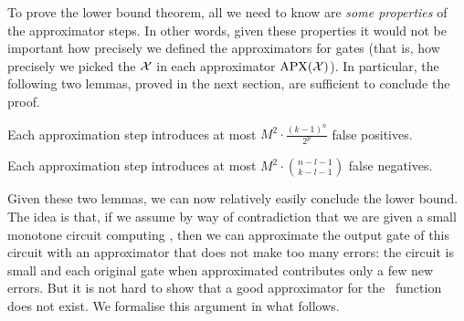 To prove the lower bound theorem, all we need to know are \emph{some properties} of the approximator steps. In other words, given these properties it would not be important how precisely we defined the approximators for gates (that is, how precisely we picked the $\mathcal{X}$ in each approximator $\mathrm{APX}(\mathcal{X})$).
In particular, the following two lemmas, proved in the next section, are sufficient to conclude the proof. 
\begin{lemma}\label{lem:new-false-positives}
Each approximation step introduces at most $M^2 \cdot \frac{(k-1)^n}{2^p}$ false positives.
\end{lemma}

\begin{lemma}\label{lem:new-false-negatives}
Each approximation step introduces at most $M^2 \cdot\binom{n-l-1}{k-l-1}$ false negatives.
\end{lemma}


Given these two lemmas, we can now relatively easily conclude the lower bound. The idea is that, if we assume by way of contradiction that we are given a small monotone circuit computing \cliquenk, then we can approximate the output gate of this circuit with an approximator that does not make too many errors: the circuit is small and each original gate when approximated contributes only a few new errors. But it is not hard to show that a good approximator for the \cliquenk\ function does not exist. We formalise this argument in what follows.





\bigskip









